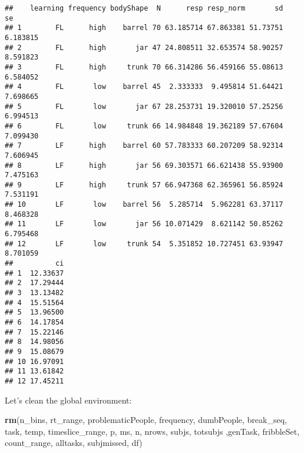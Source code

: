 \documentclass[
]{article}
\newenvironment{Shaded}{\begin{snugshade}}{\end{snugshade}}
\newcommand{\DataTypeTok}[1]{\textcolor[rgb]{0.13,0.29,0.53}{#1}}
\newcommand{\DecValTok}[1]{\textcolor[rgb]{0.00,0.00,0.81}{#1}}
\newcommand{\FloatTok}[1]{\textcolor[rgb]{0.00,0.00,0.81}{#1}}
\newcommand{\KeywordTok}[1]{\textcolor[rgb]{0.13,0.29,0.53}{\textbf{#1}}}
\newcommand{\NormalTok}[1]{#1}
\newcommand{\OperatorTok}[1]{\textcolor[rgb]{0.81,0.36,0.00}{\textbf{#1}}}
\newcommand{\StringTok}[1]{\textcolor[rgb]{0.31,0.60,0.02}{#1}}
\begin{document}
\begin{Shaded}
\end{Shaded}

\begin{verbatim}
##    learning frequency bodyShape  N      resp resp_norm       sd       se
## 1        FL      high    barrel 70 63.185714 67.863381 51.73751 6.183815
## 2        FL      high       jar 47 24.808511 32.653574 58.90257 8.591823
## 3        FL      high     trunk 70 66.314286 56.459166 55.08613 6.584052
## 4        FL       low    barrel 45  2.333333  9.495814 51.64421 7.698665
## 5        FL       low       jar 67 28.253731 19.320010 57.25256 6.994513
## 6        FL       low     trunk 66 14.984848 19.362189 57.67604 7.099430
## 7        LF      high    barrel 60 57.783333 60.207209 58.92314 7.606945
## 8        LF      high       jar 56 69.303571 66.621438 55.93900 7.475163
## 9        LF      high     trunk 57 66.947368 62.365961 56.85924 7.531191
## 10       LF       low    barrel 56  5.285714  5.962281 63.37117 8.468328
## 11       LF       low       jar 56 10.071429  8.621142 50.85262 6.795468
## 12       LF       low     trunk 54  5.351852 10.727451 63.93947 8.701059
##          ci
## 1  12.33637
## 2  17.29444
## 3  13.13482
## 4  15.51564
## 5  13.96500
## 6  14.17854
## 7  15.22146
## 8  14.98056
## 9  15.08679
## 10 16.97091
## 11 13.61842
## 12 17.45211
\end{verbatim}

Let's clean the global environment:

\begin{Shaded}
\begin{Highlighting}[]
\KeywordTok{rm}\NormalTok{(n_bins, rt_range, problematicPeople, frequency, dumbPeople, break_seq, task, temp, timeslice_range, p, ms, n, nrows, subjs, totsubjs ,genTask, fribbleSet, count_range, alltasks, subjmissed, df)}
\end{Highlighting}
\end{Shaded}
\end{document}
